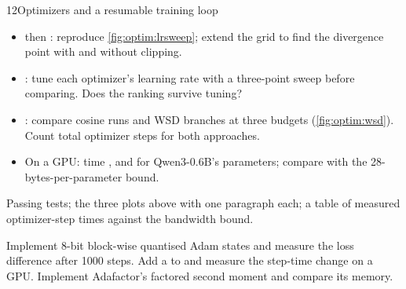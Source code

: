 \begin{labbox}{12}{Optimizers and a resumable training loop}
\begin{itemize}
  \item {} then : reproduce
        \cref{fig:optim:lrsweep}; extend the grid to find the divergence point with and without
        clipping.
  \item {}: tune each optimizer's learning rate with a three-point sweep
        before comparing. Does the ranking survive tuning?
  \item {}: compare cosine runs and WSD branches at three budgets
        (\cref{fig:optim:wsd}). Count total optimizer steps for both approaches.
  \item On a GPU: time ,  and
         for Qwen3-0.6B's parameters; compare with the
        28-bytes-per-parameter bound.
\end{itemize}

Passing tests; the three plots above with one paragraph each; a table of measured optimizer-step
times against the bandwidth bound.

Implement 8-bit block-wise quantised Adam states and measure the loss difference after 1000
steps. Add a  to  and measure the step-time change on a
GPU. Implement Adafactor's factored second moment and compare its memory.
\end{labbox}
